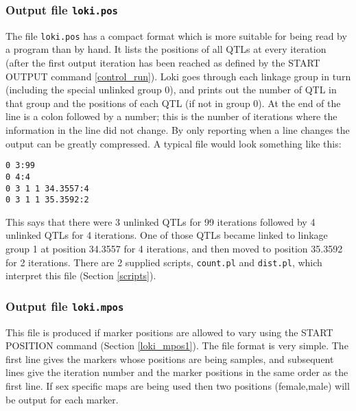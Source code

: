 \documentclass[10pt,a4paper]{article}
\begin{document}
\subsubsection{Output file \texttt{loki.pos}}
The file \verb+loki.pos+ has a compact format which is more suitable for
being read by a program than by hand.  It lists the positions of all QTLs at
every iteration (after the first output iteration has been reached as defined by the
START OUTPUT command \ref{control_run}).  Loki goes through each linkage
group in turn (including the special unlinked group 0), and prints out the
number of QTL in that group and the positions of each QTL (if not in group
0).  At the end of the line is a colon followed by a number; this is the
number of iterations where the information in the line did not change.  By
only reporting when a line changes the output can be greatly compressed.
A typical file would look something like this:
\begin{verbatim}
0 3:99
0 4:4
0 3 1 1 34.3557:4
0 3 1 1 35.3592:2
\end{verbatim}
This says that there were 3 unlinked QTLs for 99 iterations followed by 4
unlinked QTLs for 4 iterations.  One of those QTLs became linked to linkage
group 1 at position 34.3557 for 4 iterations, and then moved to position
35.3592 for 2 iterations.  There are 2 supplied scripts, \verb+count.pl+ and
\verb+dist.pl+, which interpret this file (Section \ref{scripts}).
\subsubsection{Output file \texttt{loki.mpos}}
\label{loki_mpos}
This file is produced if marker positions are allowed to vary using the
START POSITION command (Section \ref{loki_mpos1}).  The file format is very
simple.  The first line gives the markers whose positions are being samples,
and subsequent lines give the iteration number and the marker positions in
the same order as the first line.  If sex specific maps are being used then
two positions (female,male) will be output for each marker.
\end{document}
